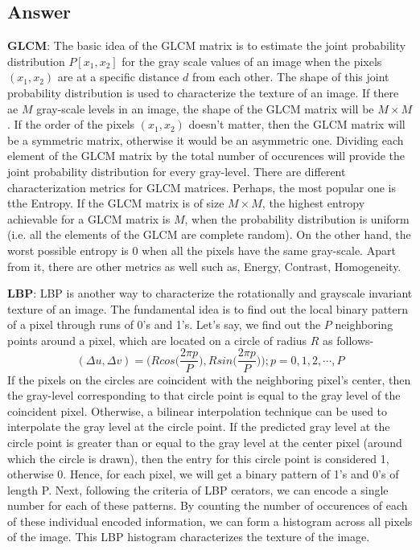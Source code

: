 \documentclass{article}
\begin{document}
\subsection*{Answer}
\par \textbf{GLCM}: The basic idea of the GLCM matrix is to estimate the joint probability distribution $P[x_1,x_2]$ for the gray scale values of an image when the pixels $(x_1,x_2)$ are at a specific distance $d$ from each other. The shape of this joint probability distribution is used to characterize the texture of an image. If there ae $M$ gray-scale levels in an image, the shape of the GLCM matrix will be $M\times M$. If the order of the pixels $(x_1,x_2)$ doesn't matter, then the GLCM matrix will be a symmetric matrix, otherwise it would be an asymmetric one. Dividing each element of the GLCM matrix by the total number of occurences will provide the joint probability distribution for every gray-level. There are different characterization metrics for GLCM matrices. Perhaps, the most popular one is tthe Entropy. If the GLCM matrix is of size $M\times M$, the highest entropy achievable for a GLCM matrix is $M$, when the probability distribution is uniform (i.e. all the elements of the GLCM are complete random). On the other hand, the worst possible entropy is $0$ when all the pixels have the same gray-scale. Apart from it, there are other metrics as well such as, Energy, Contrast, Homogeneity.
\par \textbf{LBP}: LBP is another way to characterize the rotationally and grayscale invariant texture of an image. The fundamental idea is to find out the local binary pattern of a pixel through runs of 0's and 1's. Let's say, we find out the $P$ neighboring points around a pixel, which are located on a circle of radius $R$ as follows-
\begin{equation}
	(\Delta u , \Delta v) = \bigg(Rcos\big(\frac{2\pi p}{P}\big),Rsin\big(\frac{2\pi p}{P}\big)\bigg); p=0,1,2,\cdots, P
\end{equation}
If the pixels on the circles are coincident with the neighboring pixel's center, then the gray-level corresponding to that circle point is equal to the gray level of the coincident pixel. Otherwise, a bilinear interpolation technique can be used to interpolate the gray level at the circle point. If the predicted gray level at the circle point is greater than or equal to the gray level at the center pixel (around which the circle is drawn), then the entry for this circle point is considered 1, otherwise 0. Hence, for each pixel, we will get a binary pattern of 1's and 0's of length P. Next, following the criteria of LBP cerators, we can encode a single number for each of these patterns. By counting the number of occurences of each of these individual encoded information, we can form a histogram across all pixels of the image. This LBP histogram characterizes the texture of the image.
\end{document}
